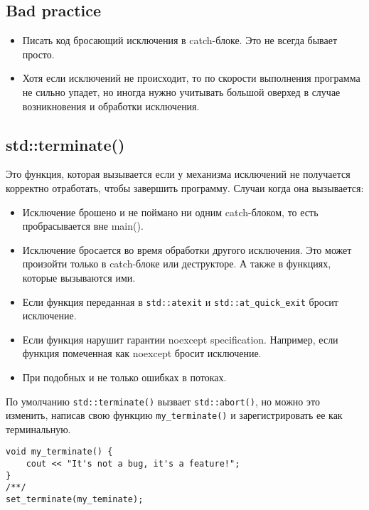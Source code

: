 \subsection{Bad practice}
\begin{itemize}
\item 
Писать код бросающий исключения в catch-блоке. Это не всегда бывает просто.
\item 
Хотя если исключений не происходит, то по скорости выполнения программа не сильно упадет, но иногда нужно учитывать большой оверхед в случае возникновения и обработки исключения.
\end{itemize}

\subsection{std::terminate()}

Это функция, которая вызывается если у механизма исключений не получается корректно отработать, чтобы завершить программу.
Случаи когда она вызывается:
\begin{itemize}
\item Исключение брошено и не поймано ни одним catch-блоком, то есть пробрасывается вне main().
\item Исключение бросается во время обработки другого исключения. Это может произойти только в catch-блоке или деструкторе. А также в функциях, которые вызываются ими.
\item Если функция переданная в \texttt{std::atexit} и \texttt{std::at_quick_exit} бросит исключение.
\item Если функция нарушит гарантии noexcept specification. Например, если функция помеченная как noexcept бросит исключение.
\item При подобных и не только ошибках в потоках.
\end{itemize}

По умолчанию \texttt{std::terminate()} вызвает \texttt{std::abort()}, но можно это изменить, написав свою функцию \texttt{my_terminate()} и зарегистрировать ее как терминальную.
\begin{verbatim}
void my_terminate() {
    cout << "It's not a bug, it's a feature!";
}
/**/
set_terminate(my_teminate);
\end{verbatim}
